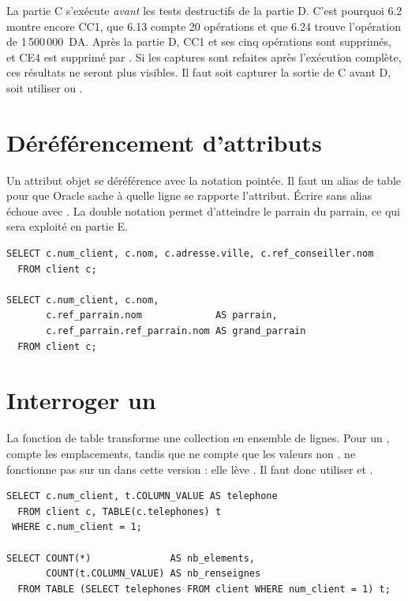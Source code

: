\begin{attentionbox}
La partie C s'exécute \emph{avant} les tests destructifs de la partie D. C'est
pourquoi 6.2 montre encore CC1, que 6.13 compte 20 opérations et que 6.24
trouve l'opération de 1\,500\,000~DA. Après la partie D, CC1 et ses cinq
opérations sont supprimés, et CE4 est supprimé par
. Si les captures sont refaites après l'exécution
complète, ces résultats ne seront plus visibles. Il faut soit capturer la
sortie de C avant D, soit utiliser  ou
.
\end{attentionbox}

\section{Déréférencement d'attributs}

Un attribut objet se déréférence avec la notation pointée. Il faut un alias de
table pour que Oracle sache à quelle ligne se rapporte l'attribut. Écrire
 sans alias échoue avec . La
double notation 
permet d'atteindre le parrain du parrain, ce qui sera exploité en partie E.

\begin{lstlisting}[caption={Déréférencement d'attributs objet.},label={lst:dereferencement}]
SELECT c.num_client, c.nom, c.adresse.ville, c.ref_conseiller.nom
  FROM client c;

SELECT c.num_client, c.nom,
       c.ref_parrain.nom             AS parrain,
       c.ref_parrain.ref_parrain.nom AS grand_parrain
  FROM client c;
\end{lstlisting}

\section{Interroger un }

La fonction de table  transforme une collection en ensemble de
lignes. Pour un ,  compte les emplacements, tandis
que  ne compte que les valeurs non .
 ne fonctionne pas sur un  dans cette version :
elle lève . Il faut donc utiliser  et
.

\begin{lstlisting}[caption={Interrogation d'un \code{VARRAY} de téléphones.},label={lst:varray}]
SELECT c.num_client, t.COLUMN_VALUE AS telephone
  FROM client c, TABLE(c.telephones) t
 WHERE c.num_client = 1;

SELECT COUNT(*)              AS nb_elements,
       COUNT(t.COLUMN_VALUE) AS nb_renseignes
  FROM TABLE (SELECT telephones FROM client WHERE num_client = 1) t;
\end{lstlisting}

